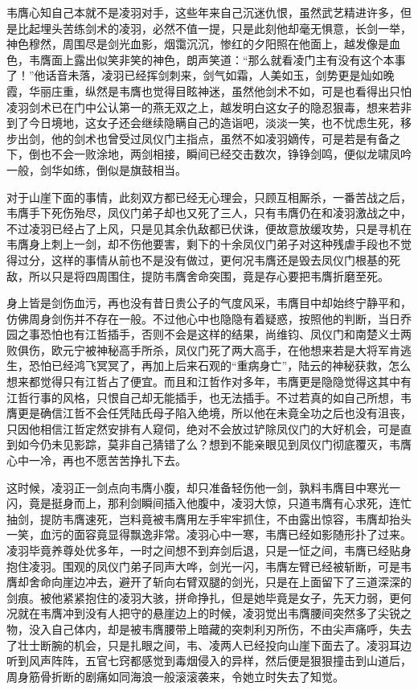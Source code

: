 韦膺心知自己本就不是凌羽对手，这些年来自己沉迷仇恨，虽然武艺精进许多，但是比起埋头苦练剑术的凌羽，必然不值一提，只是此刻他却毫无惧意，长剑一举，神色穆然，周围尽是剑光血影，烟霭沉沉，惨红的夕阳照在他面上，越发像是血色，韦膺面上露出似笑非笑的神色，朗声笑道：“那么就看凌门主有没有这个本事了！”他话音未落，凌羽已经挥剑刺来，剑气如霜，人美如玉，剑势更是灿如晚霞，华丽庄重，纵然是韦膺也觉得目眩神迷，虽然他剑术不如，可是也看得出只怕凌羽剑术已在门中公认第一的燕无双之上，越发明白这女子的隐忍狠毒，想来若非到了今日境地，这女子还会继续隐瞒自己的造诣吧，淡淡一笑，也不忧虑生死，移步出剑，他的剑术也曾受过凤仪门主指点，虽然不如凌羽嫡传，可是若是有备之下，倒也不会一败涂地，两剑相接，瞬间已经交击数次，铮铮剑鸣，便似龙啸凤吟一般，剑华如练，倒似是旗鼓相当。

对于山崖下面的事情，此刻双方都已经无心理会，只顾互相厮杀，一番苦战之后，韦膺手下死伤殆尽，凤仪门弟子却也又死了三人，只有韦膺仍在和凌羽激战之中，不过凌羽已经占了上风，只是见其余仇敌都已伏诛，便故意放缓攻势，只是寻机在韦膺身上刺上一剑，却不伤他要害，剩下的十余凤仪门弟子对这种残虐手段也不觉得过分，这样的事情从前也不是没有做过，更何况韦膺还是毁去凤仪门根基的死敌，所以只是将四周围住，提防韦膺舍命突围，竟是存心要把韦膺折磨至死。

身上皆是剑伤血污，再也没有昔日贵公子的气度风采，韦膺目中却始终宁静平和，仿佛周身剑伤并不存在一般。不过他心中也隐隐有着疑惑，按照他的判断，当日乔园之事恐怕也有江哲插手，否则不会是这样的结果，尚维钧、凤仪门和南楚义士两败俱伤，欧元宁被神秘高手所杀，凤仪门死了两大高手，在他想来若是大将军肯逃生，恐怕已经鸿飞冥冥了，再加上后来石观的“重病身亡”，陆云的神秘获救，怎么想来都觉得只有江哲占了便宜。而且和江哲作对多年，韦膺更是隐隐觉得这其中有江哲行事的风格，只恨自己却无能插手，也无法插手。不过若真的如自己所想，韦膺更是确信江哲不会任凭陆氏母子陷入绝境，所以他在未竟全功之后也没有沮丧，只因他相信江哲定然安排有人窥伺，绝对不会放过铲除凤仪门的大好机会，可是直到如今仍未见影踪，莫非自己猜错了么？想到不能亲眼见到凤仪门彻底覆灭，韦膺心中一冷，再也不愿苦苦挣扎下去。

这时候，凌羽正一剑点向韦膺小腹，却只准备轻伤他一剑，孰料韦膺目中寒光一闪，竟是挺身而上，那利剑瞬间插入他腹中，凌羽大惊，只道韦膺有心求死，连忙抽剑，提防韦膺速死，岂料竟被韦膺用左手牢牢抓住，不由露出惊容，韦膺却抬头一笑，血污的面容竟显得飘逸非常。凌羽心中一寒，韦膺已经如影随形扑了过来。凌羽毕竟养尊处优多年，一时之间想不到弃剑后退，只是一怔之间，韦膺已经贴身抱住凌羽。围观的凤仪门弟子同声大哗，剑光一闪，韦膺左臂已经被斩断，可是韦膺却舍命向崖边冲去，避开了斩向右臂双腿的剑光，只是在上面留下了三道深深的剑痕。被他紧紧抱住的凌羽大骇，拼命挣扎，但是她毕竟是女子，先天力弱，更何况就在韦膺冲到没有人把守的悬崖边上的时候，凌羽觉出韦膺腰间突然多了尖锐之物，没入自己体内，却是被韦膺腰带上暗藏的突刺利刃所伤，不由尖声痛呼，失去了壮士断腕的机会，只是扎眼之间，韦、凌两人已经投向山崖下面去了。凌羽耳边听到风声阵阵，五官七窍都感觉到毒烟侵入的异样，然后便是狠狠撞击到山道后，周身筋骨折断的剧痛如同海浪一般滚滚袭来，令她立时失去了知觉。

